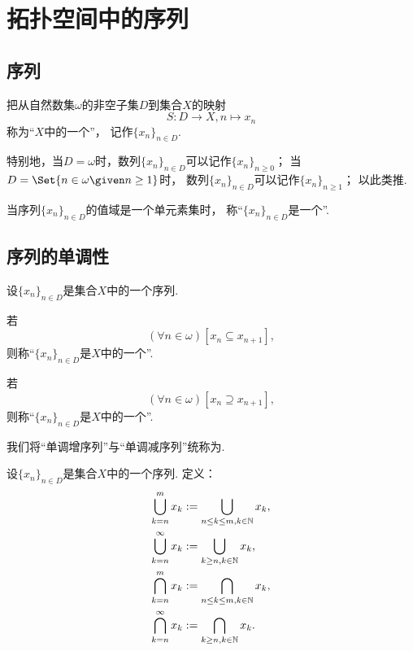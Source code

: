 \section{拓扑空间中的序列}
\subsection{序列}
\begin{definition}
把从自然数集\(\omega\)的非空子集\(D\)到集合\(X\)的映射\[
	S\colon D \to X, n \mapsto x_n
\]称为“\(X\)中的一个”，
记作\(\{x_n\}_{n \in D}\).
\end{definition}

特别地，当\(D = \omega\)时，数列\(\{x_n\}_{n \in D}\)可以记作\(\{x_n\}_{n\geq0}\)；
当\(D = \Set{ n \in \omega \given n \geq 1}\)时，
数列\(\{x_n\}_{n \in D}\)可以记作\(\{x_n\}_{n\geq1}\)；
以此类推.

当序列\(\{x_n\}_{n \in D}\)的值域是一个单元素集时，
称“\(\{x_n\}_{n \in D}\)是一个”.

\subsection{序列的单调性}
\begin{definition}
设\(\{x_n\}_{n \in D}\)是集合\(X\)中的一个序列.

若\[
	(\forall n\in\omega)
	[x_n \subseteq x_{n+1}],
\]
则称“\(\{x_n\}_{n \in D}\)是\(X\)中的一个”.

若\[
	(\forall n\in\omega)
	[x_n \supseteq x_{n+1}],
\]
则称“\(\{x_n\}_{n \in D}\)是\(X\)中的一个”.

我们将“单调增序列”与“单调减序列”统称为.
\end{definition}

\begin{definition}
设\(\{x_n\}_{n \in D}\)是集合\(X\)中的一个序列.
定义：\begin{align*}
	\bigcup_{k=n}^m x_k
	&:=
	\bigcup_{n \leq k \leq m, k\in\mathbb{N}} x_k, \\
	\bigcup_{k=n}^\infty x_k
	&:=
	\bigcup_{k \geq n, k\in\mathbb{N}} x_k, \\
	\bigcap_{k=n}^m x_k
	&:=
	\bigcap_{n \leq k \leq m, k\in\mathbb{N}} x_k, \\
	\bigcap_{k=n}^\infty x_k
	&:=
	\bigcap_{k \geq n, k\in\mathbb{N}} x_k.
\end{align*}
\end{definition}

